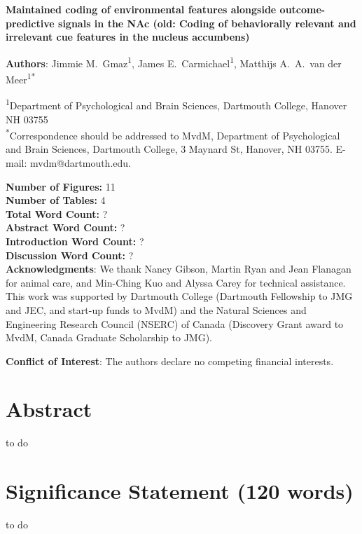 \documentclass[11pt]{article}
\begin{document}
{\Large\bf Maintained coding of environmental features alongside outcome-predictive signals in the NAc (old: Coding of behaviorally relevant and irrelevant cue features in the nucleus accumbens)}

{\bf Authors}: Jimmie M.\ Gmaz\textsuperscript{1}, James
E.\ Carmichael\textsuperscript{1}, Matthijs A.\ A.\ van der
Meer\textsuperscript{1*}

\textsuperscript{1}Department of Psychological and Brain Sciences,
Dartmouth College, Hanover NH
03755\\ 

\textsuperscript{*}Correspondence should be addressed to MvdM,
Department of Psychological and Brain Sciences, Dartmouth College, 3
Maynard St, Hanover, NH 03755. E-mail: {\sffamily mvdm@dartmouth.edu}.

\textbf{Number of Figures:} 11\\
\textbf{Number of Tables:} 4\\
\textbf{Total Word Count:} ?\\
\textbf{Abstract Word Count:} ?\\
\textbf{Introduction Word Count:} ?\\
\textbf{Discussion Word Count:} ?\\

\textbf{Acknowledgments}: We thank Nancy Gibson, Martin Ryan and Jean
Flanagan for animal care, and Min-Ching Kuo and
Alyssa Carey for technical assistance. This work was supported by
Dartmouth College (Dartmouth Fellowship to JMG and JEC, and start-up funds to
MvdM) and the Natural Sciences and Engineering Research Council
(NSERC) of Canada (Discovery Grant award to MvdM, Canada Graduate
Scholarship to JMG).

\textbf{Conflict of Interest}: The authors declare no competing
financial interests.\\

\newpage
\linenumbers

\section*{Abstract}

to do

\section*{Significance Statement (120 words)}

to do

\newpage
\end{document}
